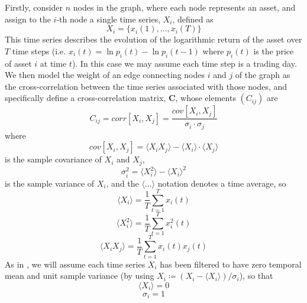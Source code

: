 \documentclass[12pt]{article}
\numberwithin{equation}{section}
\newcommand*\mean[1]{\langle#1\rangle}
\begin{document}
Firstly, consider $n$ nodes in the graph, where each node represents an asset, and assign to the $i$-th node a single time series, $X_{i}$, defined as
\begin{equation}
\label{eq:singleTimeSeries}
	X_{i} = \{x_{i}(1),\dots,x_{i}(T)\}
\end{equation}
This time series describes the evolution of the logarithmic return of the asset over $T$ time steps (i.e. $x_{i}(t) = \ln p_{i}(t) - \ln p_{i}(t-1)$ where $p_{i}(t)$ is the price of asset $i$ at time $t$).
In this case we may assume each time step is a trading day. We then model the weight of an edge connecting nodes $i$ and $j$ of the graph as the cross-correlation between the time series associated with those nodes, and specifically define a cross-correlation matrix, $\mathbf{C}$, whose elements $(C_{ij})$ are
\begin{equation}
\label{eq:crossCorrelationMatrix}
	C_{ij} = corr[X_{i},X_{j}] = \frac{cov[X_{i},X_{j}]}{\sigma_{i} \cdot \sigma_{j}}
\end{equation}
where
\begin{equation}
\label{eq:sampleCovariance}
	cov[X_{i},X_{j}] = \mean{X_{i} X_{j}} - \mean{X_{i}} \cdot \mean{X_{j}}
\end{equation}
is the sample covariance of $X_{i}$ and $X_{j}$,
\begin{equation}
\label{eq:sampleVariance}
	\sigma_{i}^{2} = \mean{X_{i}^{2}} - \mean{X_{i}}^{2}
\end{equation}
is the sample variance of $X_{i}$, and the $\mean{\dots}$ notation denotes a time average, so
\begin{equation}
\label{eq:temporalMean}
	\mean{X_{i}} = \frac{1}{T} \sum_{t=1}^{T} x_{i}(t)
\end{equation}
\begin{equation}
\label{eq:temporalMeanSquare}
	\mean{X_{i}^{2}} = \frac{1}{T} \sum_{t=1}^{T} x_{i}^{2}(t)
\end{equation}
\begin{equation}
\label{eq:temporalMeanProduct}
	\mean{X_{i}X_{j}} = \frac{1}{T} \sum_{t=1}^{T} x_{i}(t)x_{j}(t)
\end{equation}
As in \cite{MG13}, we will assume each time series $X_{i}$ has been filtered to have zero temporal mean and unit sample variance (by using $X_{i} \coloneqq (X_{i} - \mean{X_{i}}) / \sigma_{i}$), so that
\begin{equation}
\label{eq:zeroSampleMean}
	\mean{X_{i}} = 0
\end{equation}
\begin{equation}
\label{eq:unitSampleVariance}
	\sigma_{i} = 1
\end{equation}
\end{document}
